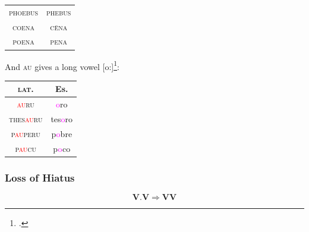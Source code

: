 \documentclass{report}[12pt]
\begin{document}
\begin{center}
  \begin{tabular}{c c}
    \textsc{phoebus} & \textsc{phebus} \\
    \textsc{coena} & \textsc{c\={e}na} \\
    \textsc{poena} & \textsc{pena} \\ 
  \end{tabular}
\end{center}
And \textsc{au} gives a long vowel [o:]\footcite[p.~24]{romance_his}:
\begin{center}
\begin{tabular}{c c}
  \textsc{lat.} & Es. \\
  \hline
  \textsc{\textcolor{red}{au}ru} & \textcolor{magenta}{o}ro \\
  \textsc{thes\textcolor{red}{au}ru} & tes\textcolor{magenta}{o}ro \\
  \textsc{p\textcolor{red}{au}peru} & p\textcolor{magenta}{o}bre \\
  \textsc{p\textcolor{red}{au}cu} & p\textcolor{magenta}{o}co \\
\end{tabular}
\end{center}

\subsubsection{Loss of Hiatus}

\begin{tcolorbox}
  \[ \textbf{V}.\textbf{V} \Rightarrow \textbf{VV} \]
\end{tcolorbox}
\end{document}
